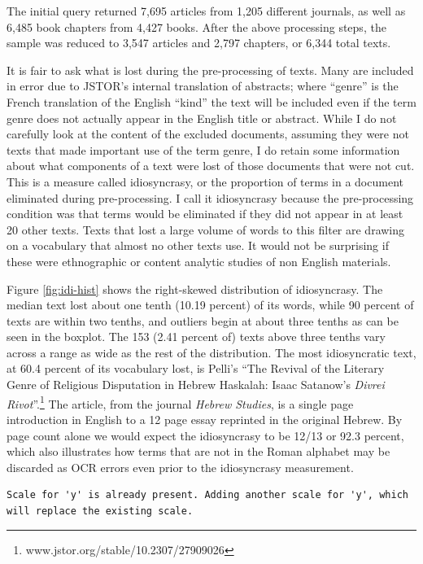 \documentclass[]{book}
\let\rmarkdownfootnote\footnote%
\def\footnote{\protect\rmarkdownfootnote}
\theoremstyle{definition}
\theoremstyle{definition}
\theoremstyle{definition}
\theoremstyle{remark}
\begin{document}
The initial query returned 7,695 articles from 1,205 different journals,
as well as 6,485 book chapters from 4,427 books. After the above
processing steps, the sample was reduced to 3,547 articles and 2,797
chapters, or 6,344 total texts.

It is fair to ask what is lost during the pre-processing of texts. Many
are included in error due to JSTOR's internal translation of abstracts;
where ``genre'' is the French translation of the English ``kind'' the
text will be included even if the term genre does not actually appear in
the English title or abstract. While I do not carefully look at the
content of the excluded documents, assuming they were not texts that
made important use of the term genre, I do retain some information about
what components of a text were lost of those documents that were not
cut. This is a measure called idiosyncrasy, or the proportion of terms
in a document eliminated during pre-processing. I call it idiosyncrasy
because the pre-processing condition was that terms would be eliminated
if they did not appear in at least 20 other texts. Texts that lost a
large volume of words to this filter are drawing on a vocabulary that
almost no other texts use. It would not be surprising if these were
ethnographic or content analytic studies of non English materials.

Figure \ref{fig:idi-hist} shows the right-skewed distribution of
idiosyncrasy. The median text lost about one tenth (10.19 percent) of
its words, while 90 percent of texts are within two tenths, and outliers
begin at about three tenths as can be seen in the boxplot. The 153 (2.41
percent of) texts above three tenths vary across a range as wide as the
rest of the distribution. The most idiosyncratic text, at 60.4 percent
of its vocabulary lost, is Pelli's ``The Revival of the Literary Genre
of Religious Disputation in Hebrew Haskalah: Isaac Satanow's
\emph{Divrei Rivot}''.\footnote{www.jstor.org/stable/10.2307/27909026}
The article, from the journal \emph{Hebrew Studies}, is a single page
introduction in English to a 12 page essay reprinted in the original
Hebrew. By page count alone we would expect the idiosyncrasy to be 12/13
or 92.3 percent, which also illustrates how terms that are not in the
Roman alphabet may be discarded as OCR errors even prior to the
idiosyncrasy measurement.

\begin{verbatim}
Scale for 'y' is already present. Adding another scale for 'y', which
will replace the existing scale.
\end{verbatim}
\end{document}
